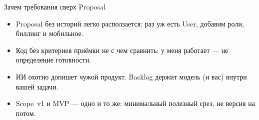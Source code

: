 \begin{frame}{Зачем требования сверх Proposal}

  \medskip
  \begin{itemize}\setlength\itemsep{0.42em}
    \item Proposal без историй легко расползается: \flqq раз уж есть User, добавим роли, биллинг и мобильное\frqq.
    \item Код без критериев приёмки не с чем сравнить: \flqq у меня работает\frqq{} --- не определение готовности.
    \item ИИ охотно допишет чужой продукт. Backlog держит модель (и вас) внутри вашей задачи.
    \item Scope~v1 и MVP --- одно и то же: минимальный полезный срез, не \flqq версия на потом\frqq.
  \end{itemize}
\end{frame}

